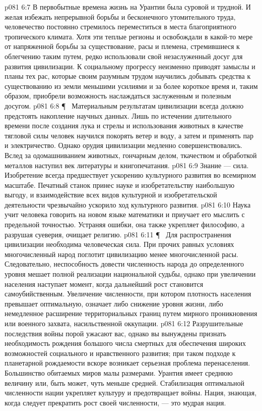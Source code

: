 \vs p081 6:7 В первобытные времена жизнь на Урантии была суровой и трудной. И желая избежать непрерывной борьбы и бесконечного утомительного труда, человечество постоянно стремилось переместиться в места благоприятного тропического климата. Хотя эти теплые регионы и освобождали в какой\hyp{}то мере от напряженной борьбы за существование, расы и племена, стремившиеся к облегчению таким путем, редко использовали свой незаслуженный досуг для развития цивилизации. К социальному прогрессу неизменно приводят замыслы и планы тех рас, которые своим разумным трудом научились добывать средства к существованию из земли меньшими усилиями и за более короткое время и, таким образом, приобрели возможность наслаждаться заслуженным и полезным досугом.
\vs p081 6:8 \P\ \bibnobreakspace {} Материальным результатам цивилизации всегда должно предстоять накопление научных данных. Лишь по истечении длительного времени после создания лука и стрелы и использования животных в качестве тягловой силы человек научился покорять ветер и воду, а затем и применять пар и электричество. Однако орудия цивилизации медленно совершенствовались. Вслед за одомашниванием животных, гончарным делом, ткачеством и обработкой металлов наступил век литературы и книгопечатания.
\vs p081 6:9 Знание --- сила. Изобретение всегда предшествует ускорению культурного развития во всемирном масштабе. Печатный станок принес науке и изобретательству наибольшую выгоду, и взаимодействие всех видов культурной и изобретательской деятельности чрезвычайно ускорило ход культурного развития.
\vs p081 6:10 Наука учит человека говорить на новом языке математики и приучает его мыслить с предельной точностью. Устраняя ошибки, она также укрепляет философию, а разрушая суеверия, очищает религию.
\vs p081 6:11 \P\ \bibnobreakspace {} Для распространения цивилизации необходима человеческая сила. При прочих равных условиях многочисленный народ поглотит цивилизацию менее многочисленной расы. Следовательно, неспособность довести численность народа до определенного уровня мешает полной реализации национальной судьбы, однако при увеличении населения наступает момент, когда дальнейший рост становится самоубийственным. Увеличение численности, при котором плотность населения превышает оптимальную, означает либо снижение уровня жизни, либо немедленное расширение территориальных границ путем мирного проникновения или военного захвата, насильственной оккупации.
\vs p081 6:12 Разрушительные последствия войны порой ужасают вас, однако вы вынуждены признать необходимость рождения большого числа смертных для обеспечения широких возможностей социального и нравственного развития; при таком подходе к планетарной рождаемости вскоре возникает серьезная проблема перенаселения. Большинство обитаемых миров малы размерами. Урантия имеет среднюю величину или, быть может, чуть меньше средней. Стабилизация оптимальной численности нации укрепляет культуру и предотвращает войны. Нация, знающая, когда следует прекратить рост своей численности, --- это мудрая нация.
